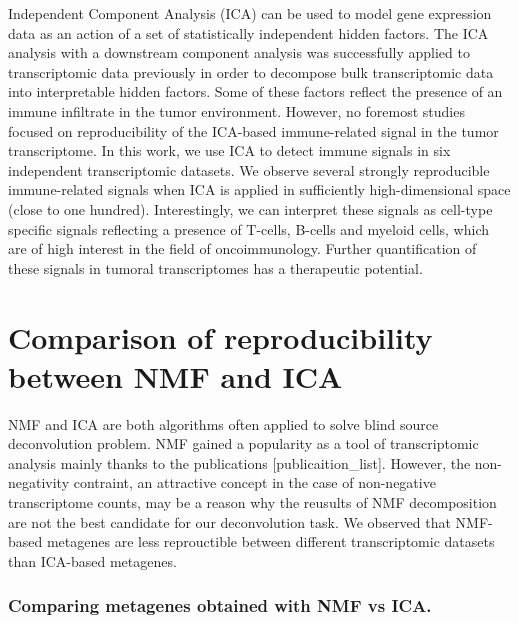 \documentclass[12pt,]{book}
\theoremstyle{definition}
\theoremstyle{definition}
\theoremstyle{definition}
\theoremstyle{remark}
\begin{document}
Independent Component Analysis (ICA) can be used to model gene
expression data as an action of a set of statistically independent
hidden factors. The ICA analysis with a downstream component analysis
was successfully applied to transcriptomic data previously in order to
decompose bulk transcriptomic data into interpretable hidden factors.
Some of these factors reflect the presence of an immune infiltrate in
the tumor environment. However, no foremost studies focused on
reproducibility of the ICA-based immune-related signal in the tumor
transcriptome. In this work, we use ICA to detect immune signals in six
independent transcriptomic datasets. We observe several strongly
reproducible immune-related signals when ICA is applied in sufficiently
high-dimensional space (close to one hundred). Interestingly, we can
interpret these signals as cell-type specific signals reflecting a
presence of T-cells, B-cells and myeloid cells, which are of high
interest in the field of oncoimmunology. Further quantification of these
signals in tumoral transcriptomes has a therapeutic potential.

\citep{Czerwinska2018b}



\hypertarget{comparison-of-reproducibility-between-nmf-and-ica}{%
\chapter{Comparison of reproducibility between NMF and
ICA}\label{comparison-of-reproducibility-between-nmf-and-ica}}


NMF and ICA are both algorithms often applied to solve blind source
deconvolution problem. NMF gained a popularity as a tool of
transcriptomic analysis mainly thanks to the publications
{[}publicaition\_list{]}. However, the non-negativity contraint, an
attractive concept in the case of non-negative transcriptome counts, may
be a reason why the reusults of NMF decomposition are not the best
candidate for our deconvolution task. We observed that NMF-based
metagenes are less reprouctible between different transcriptomic
datasets than ICA-based metagenes.

\hypertarget{comparing-metagenes-obtained-with-nmf-vs-ica.}{%
\subsection{Comparing metagenes obtained with NMF vs
ICA.}\label{comparing-metagenes-obtained-with-nmf-vs-ica.}}
\end{document}
